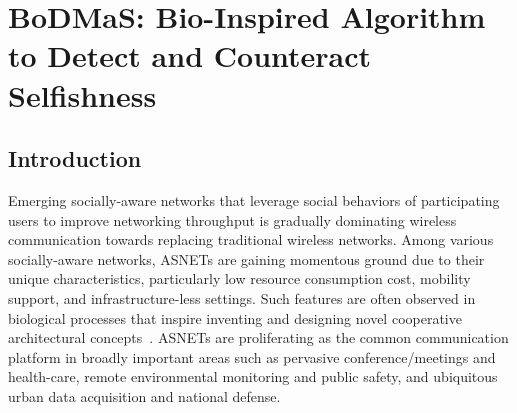 \chapter{BoDMaS: Bio-Inspired Algorithm to Detect and Counteract Selfishness}\label{Chap6}

\section{Introduction}\label{Chap6_01}
Emerging socially-aware networks that leverage social behaviors of participating users to improve networking throughput is gradually dominating wireless communication towards replacing traditional wireless networks. Among various socially-aware networks, ASNETs are gaining momentous ground due to their unique characteristics, particularly low resource consumption cost, mobility support, and infrastructure-less settings. Such features are often observed in biological processes that inspire inventing and designing novel cooperative architectural concepts~\cite{SBalasubramaniam2011}. ASNETs are proliferating as the common communication platform in broadly important areas such as pervasive conference/meetings and health-care, remote environmental monitoring and public safety, and ubiquitous urban data acquisition and national defense.

